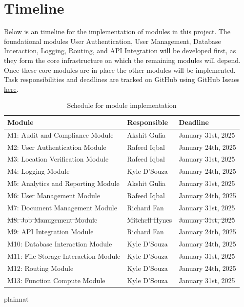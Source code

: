 \documentclass[12pt, titlepage]{article}
\begin{document}
\section{Timeline}
Below is an timeline for the implementation of modules in this
project. The foundational modules User Authentication, User
Management, Database Interaction, Logging, Routing, and API
Integration will be developed first, as they form the core
infrastructure on which the remaining modules will depend. Once these
core modules are in place the other modules will be implemented. Task
responsibilities and deadlines are tracked on GitHub using GitHub
Issues \href{https://github.com/Spitgranger/SyncMaster/issues}{here}.
\begin{table}[H]
  \centering
  \begin{tabular}{|l|l|l|}
    \hline
    \textbf{Module} & \textbf{Responsible} & \textbf{Deadline} \\
    \hline
    M1: Audit and Compliance Module  & Akshit Gulia & January 31st, 2025 \\
    \hline
    M2: User Authentication Module    & Rafeed Iqbal & January 24th, 2025 \\
    \hline
    M3: Location Verification Module  & Rafeed Iqbal & January 31st, 2025 \\
    \hline
    M4: Logging Module                & Kyle D'Souza & January 24th, 2025 \\
    \hline
    M5: Analytics and Reporting Module & Akshit Gulia & January 31st, 2025 \\
    \hline
    M6: User Management Module        & Rafeed Iqbal & January 24th, 2025 \\
    \hline
    M7: Document Management Module    & Richard Fan & January 31st, 2025 \\
    \hline
    \sout{M8: Job Management Module}        & \sout{Mitchell Hynes} & \sout{January 31st, 2025} \\
    \hline
    M9: API Integration Module        & Richard Fan & January 24th, 2025 \\
    \hline
    M10: Database Interaction Module  & Kyle D'Souza & January 24th, 2025 \\
    \hline
    M11: File Storage Interaction Module & Kyle D'Souza & January 31st, 2025 \\
    \hline
    M12: Routing Module               & Kyle D'Souza & January 24th, 2025 \\
    \hline
    M13: Function Compute Module      & Kyle D'Souza & January 31st, 2025 \\
    \hline
  \end{tabular}
  \caption{Schedule for module implementation}
  \label{TblTimeline}
\end{table}

 {plainnat}


\newpage{}
\end{document}
